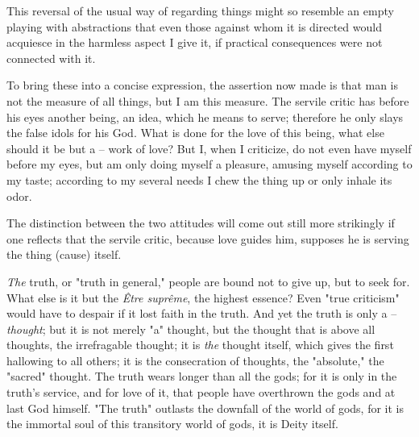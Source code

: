 \documentclass[a4paper]{book}
\begin{document}
 This reversal of the usual way of regarding things might so resemble an empty 
playing with abstractions that even those against whom it is directed would 
acquiesce in the harmless aspect I give it, if practical consequences were not 
connected with it.

To bring these into a concise expression, the assertion now made is that man 
is not the measure of all things, but I am this measure. The servile critic 
has before his eyes another being, an idea, which he means to serve; therefore 
he only slays the false idols for his God. What is done for the love of this 
being, what else should it be but a -- work of love? But I, when I criticize, 
do not even have myself before my eyes, but am only doing myself a pleasure, 
amusing myself according to my taste; according to my several needs I chew the 
thing up or only inhale its odor.

The distinction between the two attitudes will come out still more strikingly 
if one reflects that the servile critic, because love guides him, supposes he 
is serving the thing (cause) itself.

\textit{The} truth, or "{}truth in general,"{} people are bound not to give 
up, but to seek for. What else is it but the \textit{\^Etre supr\^eme}, the 
highest essence? Even "{}true criticism"{} would have to despair if it lost 
faith in the truth. And yet the truth is only a -- \textit{thought}; but it is 
not merely "{}a"{} thought, but the thought that is above all thoughts, the 
irrefragable thought; it is \textit{the} thought itself, which gives the first 
hallowing to all others; it is the consecration of thoughts, the 
"{}absolute,"{} the "{}sacred"{} thought. The truth wears longer than all the 
gods; for it is only in the truth's service, and for love of it, that people 
have overthrown the gods and at last God himself. "{}The truth"{} outlasts the 
downfall of the world of gods, for it is the immortal soul of this transitory 
world of gods, it is Deity itself.
\end{document}
